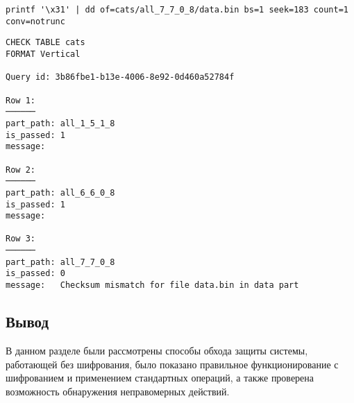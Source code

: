 \begin{lstlisting}[label=code:dd, caption={Неправомерное изменение данных.}]
printf '\x31' | dd of=cats/all_7_7_0_8/data.bin bs=1 seek=183 count=1 conv=notrunc
\end{lstlisting}

\pagebreak

\begin{lstlisting}[label=code:checkattack, caption={Результат проверки после неправомерного изменения данных.}]
CHECK TABLE cats
FORMAT Vertical

Query id: 3b86fbe1-b13e-4006-8e92-0d460a52784f

Row 1:
──────
part_path: all_1_5_1_8
is_passed: 1
message:

Row 2:
──────
part_path: all_6_6_0_8
is_passed: 1
message:

Row 3:
──────
part_path: all_7_7_0_8
is_passed: 0
message:   Checksum mismatch for file data.bin in data part
\end{lstlisting}

\subsection*{Вывод}

В данном разделе были рассмотрены способы обхода защиты системы, работающей без шифрования, было показано правильное функционирование с шифрованием и применением стандартных операций, а также проверена возможность обнаружения неправомерных действий.

\pagebreak